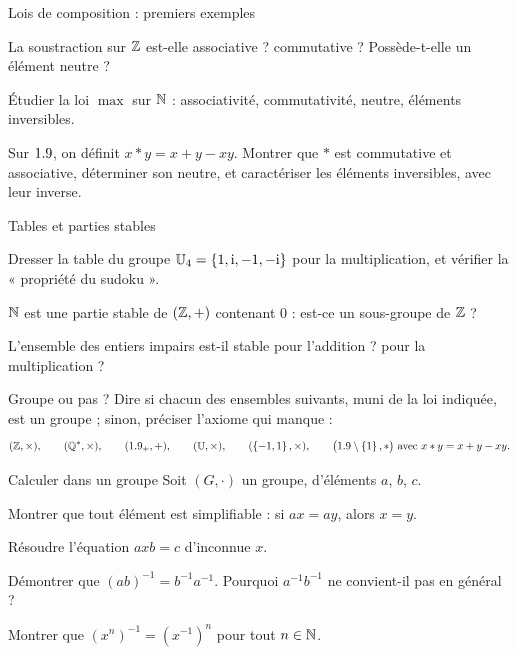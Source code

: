 \begin{exercice}[1]{Lois de composition : premiers exemples}
\begin{questions}
  \item La soustraction sur $\mathbb{Z}$ est-elle associative ? commutative ?
    Possède-t-elle un élément neutre ?
  \item Étudier la loi $\max$ sur $\mathbb{N}$ : associativité, commutativité,
    neutre, éléments inversibles.
  \item Sur $1.9$, on définit $x*y=x+y-xy$. Montrer que $*$ est commutative
    et associative, déterminer son neutre, et caractériser les éléments
    inversibles, avec leur inverse.
\end{questions}
\end{exercice}

\begin{exercice}[1]{Tables et parties stables}
\begin{questions}
  \item Dresser la table du groupe
    $\mathbb{U}_4=\left\{1,\mathrm{i},-1,-\mathrm{i}\right\}$ pour la
    multiplication, et vérifier la « propriété du sudoku ».
  \item $\mathbb{N}$ est une partie stable de $(\mathbb{Z},+)$ contenant $0$ : est-ce un
    sous-groupe de $\mathbb{Z}$ ?
  \item L'ensemble des entiers impairs est-il stable pour l'addition ?
    pour la multiplication ?
\end{questions}
\end{exercice}

\begin{exercice}[1]{Groupe ou pas ?}
Dire si chacun des ensembles suivants, muni de la loi indiquée, est un
groupe ; sinon, préciser l'axiome qui manque :
\[
  (\Z,\times),\qquad(\Q^{*},\times),\qquad(\R_{+},+),\qquad
  (\mathbb{U},\times),\qquad(\ens{-1,1},\times),\qquad
  \bigl(\R\setminus\ens{1},*\bigr)\ \text{avec}\ x*y=x+y-xy.
\]
\end{exercice}

\begin{exercice}[1]{Calculer dans un groupe}
Soit $(G,\cdot)$ un groupe, d'éléments $a$, $b$, $c$.
\begin{questions}
  \item Montrer que tout élément est simplifiable : si $ax=ay$, alors
    $x=y$.
  \item Résoudre l'équation $axb=c$ d'inconnue $x$.
  \item Démontrer que $(ab)^{-1}=b^{-1}a^{-1}$. Pourquoi
    $a^{-1}b^{-1}$ ne convient-il pas en général ?
  \item Montrer que $(x^{n})^{-1}=(x^{-1})^{n}$ pour tout $n\in\mathbb{N}$.
\end{questions}
\end{exercice}

